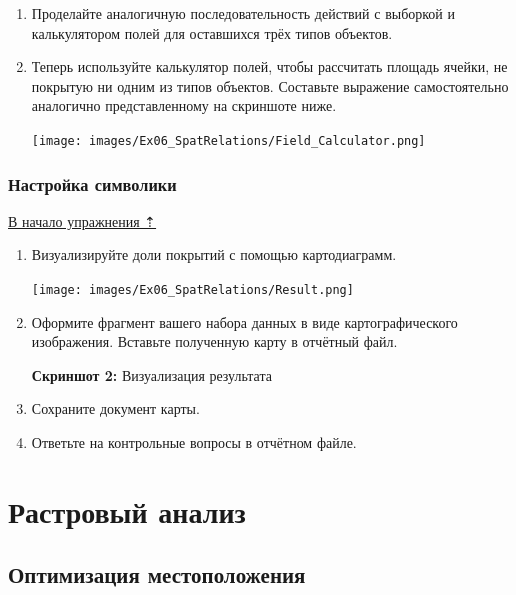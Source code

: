 \documentclass[
  12pt,
]{book}
\begin{document}
\begin{enumerate}
\def\labelenumi{\arabic{enumi}.}
\setcounter{enumi}{4}
\item
  Проделайте аналогичную последовательность действий с выборкой и калькулятором полей для оставшихся трёх типов объектов.
\item
  Теперь используйте калькулятор полей, чтобы рассчитать площадь ячейки, не покрытую ни одним из типов объектов. Составьте выражение самостоятельно аналогично представленному на скриншоте ниже.

  \texttt{[image: images/Ex06\_SpatRelations/Field\_Calculator.png]}
\end{enumerate}

\hypertarget{spatrelations-symbology}{%
\section{Настройка символики}\label{spatrelations-symbology}}

\protect\hyperlink{spatrelations}{В начало упражнения ⇡}

\begin{enumerate}
\def\labelenumi{\arabic{enumi}.}
\item
  Визуализируйте доли покрытий с помощью картодиаграмм.

  \texttt{[image: images/Ex06\_SpatRelations/Result.png]}
\item
  Оформите фрагмент вашего набора данных в виде картографического изображения. Вставьте полученную карту в отчётный файл.

  \textbf{Скриншот 2:} Визуализация результата
\item
  Сохраните документ карты.
\item
  Ответьте на контрольные вопросы в отчётном файле.
\end{enumerate}

\hypertarget{part-ux440ux430ux441ux442ux440ux43eux432ux44bux439-ux430ux43dux430ux43bux438ux437}{%
\part{Растровый анализ}\label{part-ux440ux430ux441ux442ux440ux43eux432ux44bux439-ux430ux43dux430ux43bux438ux437}}

\hypertarget{weighted-overlay}{%
\chapter{Оптимизация местоположения}\label{weighted-overlay}}
\end{document}
